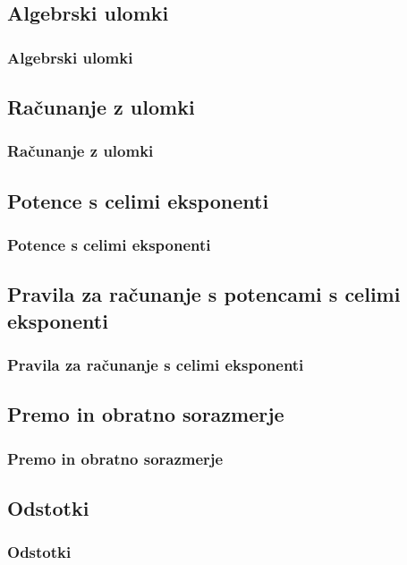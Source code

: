     \subsection{Algebrski ulomki}

        \begin{frame}
            \frametitle{Algebrski ulomki}
        \end{frame}

    \subsection{Računanje z ulomki}

        \begin{frame}
            \frametitle{Računanje z ulomki}
        \end{frame}

    \subsection{Potence s celimi eksponenti}

        \begin{frame}
            \frametitle{Potence s celimi eksponenti}
        \end{frame}

    \subsection{Pravila za računanje s potencami s celimi eksponenti}

        \begin{frame}
            \frametitle{Pravila za računanje s celimi eksponenti}
        \end{frame}

    \subsection{Premo in obratno sorazmerje}

        \begin{frame}
            \frametitle{Premo in obratno sorazmerje}
        \end{frame}

    \subsection{Odstotki}

        \begin{frame}
            \frametitle{Odstotki}
        \end{frame}
